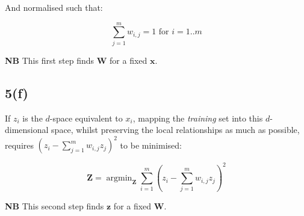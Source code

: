 \documentclass[12pt, a4paper,reqno]{article}
\DeclareMathOperator*{\argmin}{argmin}
\begin{document}
And normalised such that:

\begin{equation}
\sum_{j=1}^m w_{i, j} = 1\text{ for } i = 1..m
\end{equation}

\textbf{NB} This first step finds $\mathbf{W}$ for a fixed $\mathbf{x}$.

\subsection*{5(f)}

If $z_i$ is the $d$-space equivalent to $x_i$, mapping the \emph{training} set into this $d$-dimensional space, whilst preserving the local relationships as much as possible, requires $\left(z_i - \sum_{j=1}^m w_{i, j} z_j\right)^2$ to be minimised:

\begin{equation}
\mathbf{Z} = \argmin_{\mathbf{Z}}\sum_{i=1}^{m}\left(z_i - \sum_{j=1}^{m} w_{i, j}z_j\right)^2
\end{equation}

\textbf{NB} This second step finds $\mathbf{z}$ for a fixed $\mathbf{W}$.
\end{document}
